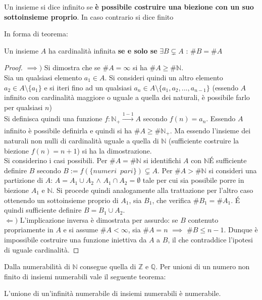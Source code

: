 \documentclass[10pt, oneside]{book}
\theoremstyle{plain}
\begin{document}
\begin{defin}
    Un insieme si dice infinito se \textbf{è possibile costruire una biezione con un suo sottoinsieme proprio}. In caso contrario si dice finito
\end{defin}
In forma di teorema:
\begin{ther}
    Un insieme $A$ ha cardinalità infinita \textbf{se e solo se} $\exists B \subsetneq A$ : $\#B = \#A$
\end{ther}
\begin{proof}
    $\mathbf{\implies)}$ Si dimostra che se $\#A = \infty$ si ha $\#A \geq \#\mathbb{N}$. 
    \\Sia un qualsiasi elemento $a_1 \in A$. Si consideri quindi un altro elemento $a_2 \in A \setminus \{a_1\}$ e si iteri fino ad un qualsiasi $a_n \in A \setminus \{a_1, a_2, ..., a_{n-1}\}$ (essendo $A$ infinito con cardinalità maggiore o uguale a quella dei naturali, è possibile farlo per qualsiasi $n$)
    \\Si definisca quindi una funzione $f: \mathbb{N}_+ \xrightarrow[]{1-1} A$ secondo $f(n) = a_n$. Essendo $A$ infinito è possibile definirla e quindi si ha $\#A \geq \#\mathbb{N}_+$. Ma essendo l'insieme dei naturali non nulli di cardinalità uguale a quella di $\mathbb{N}$ (sufficiente costruire la biezione $f(n) = n+1$) si ha la dimostrazione.
    \\Si considerino i casi possibili. Per $\#A = \#\mathbb{N}$ si identifichi $A$ con $\mathbb{N}$\'E sufficiente definire $B$ secondo $B := f(\{numeri \enspace pari\}) \subsetneq A$. Per $\#A > \#\mathbb{N}$ si consideri una partizione di $A$: $A = A_1 \cup A_2$ $\land$ $A_1 \cap A_2 = \emptyset$ tale per cui sia possibile porre in biezione $A_1$ e $\mathbb{N}$. Si procede quindi analogamente alla trattazione per l'altro caso ottenendo un sottoinsieme proprio di $A_1$, sia $B_1$, che verifica $\#B_1 = \#A_1$. \'E quindi sufficiente definire $B = B_1 \cup A_2$.
    \\$\mathbf{\Leftarrow)}$ L'implicazione inversa è dimostrata per assurdo: se $B$ contenuto propriamente in $A$ e si assume $\#A < \infty$, sia $\#A = n$ $\implies$ $\#B \leq n-1$. Dunque è impossibile costruire una funzione iniettiva da $A$ a $B$, il che contraddice l'ipotesi di uguale cardinalità.
\end{proof}
Dalla numerabilità di $\mathbb{N}$ consegue quella di $\mathbb{Z}$ e $\mathbb{Q}$. Per unioni di un numero non finito di insiemi numerabili vale il seguente teorema:
\begin{ther}
    L'unione di un'infinità numerabile di insiemi numerabili è numerabile.
\end{ther}
\end{document}
